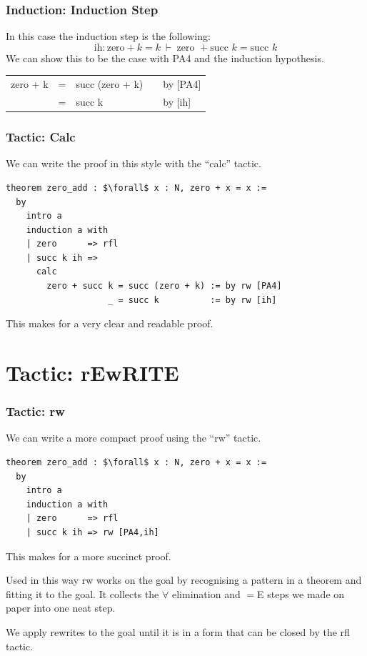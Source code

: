 \documentclass{beamer}
\theoremstyle{indentDefn} \newtheorem{defn}[]{Definition}
\begin{document}
\begin{frame}
	\frametitle{Induction: Induction Step}
	In this case the induction step is the following:
	$$\text{ih} : \text{zero} + k = k \ \vdash \ \text{zero } + \text{succ } k = \text{succ } k$$	
	We can show this to be the case with PA4 and the induction hypothesis.
	
		\begin{tabular}{r c l c l}
		 zero + \text{succ} k & = & succ (zero + k)  & & by [PA4] \\
		      & = & succ k & & by [ih] 
	\end{tabular}
\end{frame}

\begin{frame}[fragile]
	\frametitle{Tactic: Calc}
	
	We can write the proof in this style with the ``calc'' tactic.
{\footnotesize \begin{lstlisting}
theorem zero_add : $\forall$ x : N, zero + x = x := 
  by
    intro a
    induction a with
    | zero      => rfl
    | succ k ih =>
      calc
        zero + succ k = succ (zero + k) := by rw [PA4]
                    _ = succ k          := by rw [ih]                    
\end{lstlisting}}
This makes for a very clear and readable proof.
\end{frame}

\section{Tactic: rEwRITE}

\begin{frame}[fragile]
	\frametitle{Tactic: rw}
	
	We can write a more compact proof using the ``rw'' tactic.
{\footnotesize \begin{lstlisting}
theorem zero_add : $\forall$ x : N, zero + x = x := 
  by
    intro a
    induction a with
    | zero      => rfl
    | succ k ih => rw [PA4,ih]                   
\end{lstlisting}}
This makes for a more succinct proof. 

Used in this way rw works on the goal by recognising a pattern in a theorem and fitting it to the goal. It collects the $\forall$ elimination and $=$E steps we made on paper into one neat step.

We apply rewrites to the goal until it is in a form that can be closed by the rfl tactic.
\end{frame}
\end{document}
